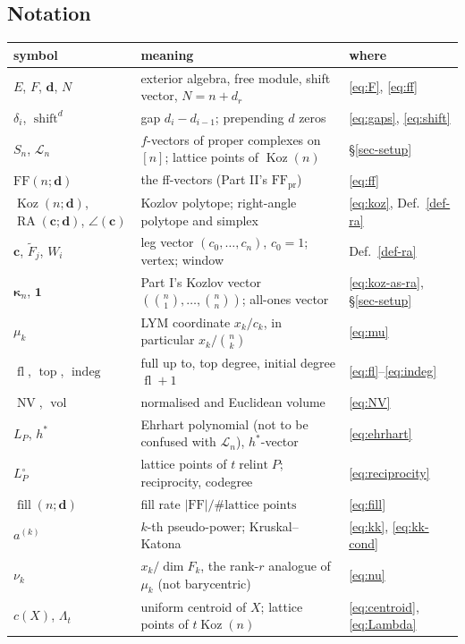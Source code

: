 \documentclass[11pt, a4paper, abstract=yes]{scrartcl}
\theoremstyle{definition}
\theoremstyle{remark}
\theoremstyle{plain}
\newcommand{\vek}[1]{\boldsymbol{#1}}
\theoremstyle{remark}
\theoremstyle{plain}
\newcommand{\Koz}{\operatorname{Koz}}
\newcommand{\shift}{\operatorname{shift}}
\newcommand{\indeg}{\operatorname{indeg}}
\newcommand{\tp}{\operatorname{top}}
\newcommand{\rasimp}{\angle}
\newcommand{\RA}{\operatorname{RA}}
\newcommand{\kozvec}{\vek\kappa}
\newcommand{\FF}{\mathrm{FF}}
\newcommand{\NV}{\operatorname{NV}}
\newcommand{\vol}{\operatorname{vol}}
\newcommand{\relint}{\operatorname{relint}}
\newcommand{\fl}{\operatorname{fl}}
\begin{document}
\subsection{Notation}
\label{sec:org1257f4a}

\begin{center}\footnotesize
\begin{tabular}{@{}lll@{}}
\toprule
symbol & meaning & where\\
\midrule
\(E\), \(F\), \(\vek d\), \(N\) & exterior algebra, free module, shift vector, \(N=n+d_r\) & \eqref{eq:F}, \eqref{eq:ff}\\
\(\delta_i\), \(\shift^d\) & gap \(d_i-d_{i-1}\); prepending \(d\) zeros & \eqref{eq:gaps}, \eqref{eq:shift}\\
\(S_n\), \(\mathcal L_n\) & \(f\)-vectors of proper complexes on \([n]\); lattice points of \(\Koz(n)\) & \S\ref{sec-setup}\\
\(\FF(n;\vek d)\) & the ff-vectors (Part II's \(\FF_{\mathrm{pr}}\)) & \eqref{eq:ff}\\
\(\Koz(n;\vek d)\), \(\RA(\vek c;\vek d)\), \(\rasimp(\vek c)\) & Kozlov polytope; right-angle polytope and simplex & \eqref{eq:koz}, Def.~\ref{def-ra}\\
\(\vek c\), \(\tilde F_j\), \(W_i\) & leg vector \((c_0,\dots,c_n)\), \(c_0=1\); vertex; window & Def.~\ref{def-ra}\\
\(\kozvec_n\), \(\vek 1\) & Part I's Kozlov vector \((\binom n1,\dots,\binom nn)\); all-ones vector & \eqref{eq:koz-as-ra}, \S\ref{sec-setup}\\
\(\mu_k\) & LYM coordinate \(x_k/c_k\), in particular \(x_k/\binom nk\) & \eqref{eq:mu}\\
\(\fl\), \(\tp\), \(\indeg\) & full up to, top degree, initial degree \(\fl+1\) & \eqref{eq:fl}--\eqref{eq:indeg}\\
\(\NV\), \(\vol\) & normalised and Euclidean volume & \eqref{eq:NV}\\
\(L_P\), \(h^*\) & Ehrhart polynomial (not to be confused with \(\mathcal L_n\)), \(h^*\)-vector & \eqref{eq:ehrhart}\\
\(L^\circ_P\) & lattice points of \(t\relint P\); reciprocity, codegree & \eqref{eq:reciprocity}\\
\(\operatorname{fill}(n;\vek d)\) & fill rate \(\lvert\FF\rvert/\#\text{lattice points}\) & \eqref{eq:fill}\\
\(a^{(k)}\) & \(k\)-th pseudo-power; Kruskal--Katona & \eqref{eq:kk}, \eqref{eq:kk-cond}\\
\(\nu_k\) & \(x_k/\dim F_k\), the rank-\(r\) analogue of \(\mu_k\) (not barycentric) & \eqref{eq:nu}\\
\(c(X)\), \(\Lambda_t\) & uniform centroid of \(X\); lattice points of \(t\Koz(n)\) & \eqref{eq:centroid}, \eqref{eq:Lambda}\\
\bottomrule
\end{tabular}
\end{center}
\end{document}
